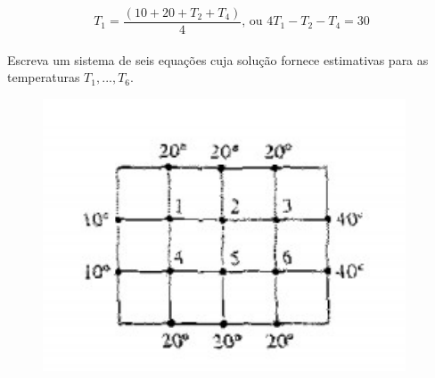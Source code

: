 \documentclass[
12pt,				%
openright,			%
twoside,			%
a4paper,			%
english,			%
french,				%
spanish,			%
brazil				%
]{abntex2_new}
\begin{document}
		$$T_1 = \frac{(10+20+T_2+T_4)}{4} \text{, ou } 4 T_1 - T_2 - T_4 = 30$$\\
		
		Escreva um sistema de seis equações cuja solução fornece estimativas para as
		temperaturas $T_1,...,T_6$.\\
		\begin{figure}[htb]
			\centering
			
			\includegraphics[scale=0.7]{figura1.png}
			
		\end{figure}
		
\end{document}
